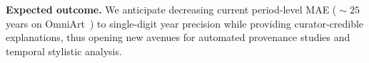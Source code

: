 \documentclass[10pt,twocolumn,letterpaper]{article}
\begin{document}
\smallskip
\noindent\textbf{Expected outcome.}
We anticipate decreasing current period-level MAE ($\!\sim\!25$ years on OmniArt~\cite{Strezoski2017}) to single-digit year precision while providing curator-credible explanations, thus opening new avenues for automated provenance studies and temporal stylistic analysis.







\end{document}
